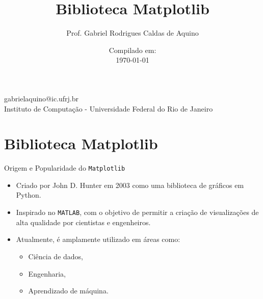 
\title{Biblioteca Matplotlib}

\author{Prof. Gabriel Rodrigues Caldas de Aquino}

\institute
{
    gabrielaquino@ic.ufrj.br\\

    Instituto de Computação -
    Universidade Federal do Rio de Janeiro %
}
\date{Compilado em: \\ \today} %


\section{Biblioteca Matplotlib}

\begin{frame}
    \titlepage
\end{frame}



\begin{frame}{Origem e Popularidade do \texttt{Matplotlib}}
    \begin{itemize}
        \item Criado por John D. Hunter em 2003 como uma biblioteca de gráficos em Python.
        \item Inspirado no \texttt{MATLAB}, com o objetivo de permitir a criação de visualizações de alta qualidade por cientistas e engenheiros.
        \item Atualmente, é amplamente utilizado em áreas como:
              \begin{itemize}
                  \item Ciência de dados,
                  \item Engenharia,
                  \item Aprendizado de máquina.
              \end{itemize}
    \end{itemize}
\end{frame}

